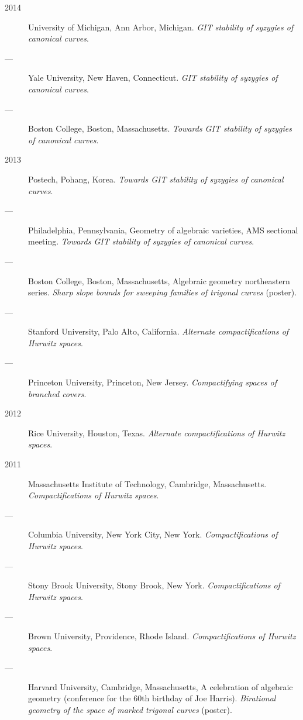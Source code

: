 \documentclass[11pt]{article}
\begin{document}
\begin{description}
\item[{2014}] University of Michigan, Ann Arbor, Michigan. \emph{GIT stability of syzygies of canonical curves}.
\item[{---}] Yale University, New Haven, Connecticut. \emph{GIT stability of syzygies of canonical curves}.
\item[{---}] Boston College, Boston, Massachusetts. \emph{Towards GIT stability of syzygies of canonical curves}.
\item[{2013}] Postech, Pohang, Korea. \emph{Towards GIT stability of syzygies of canonical curves}.
\item[{---}] Philadelphia, Pennsylvania, Geometry of algebraic varieties, AMS sectional meeting. \emph{Towards GIT stability of syzygies of canonical curves}.
\item[{---}] Boston College, Boston, Massachusetts, Algebraic geometry northeastern series. \emph{Sharp slope bounds for sweeping families of trigonal curves} (poster).
\item[{---}] Stanford University, Palo Alto, California. \emph{Alternate compactifications of Hurwitz spaces}.
\item[{---}] Princeton University, Princeton, New Jersey. \emph{Compactifying spaces of branched covers}.
\item[{2012}] Rice University, Houston, Texas. \emph{Alternate compactifications of Hurwitz spaces}.
\item[{2011}] Massachusetts Institute of Technology, Cambridge, Massachusetts. \emph{Compactifications of Hurwitz spaces}.
\item[{---}] Columbia University, New York City, New York. \emph{Compactifications of Hurwitz spaces}.
\item[{---}] Stony Brook University, Stony Brook, New York. \emph{Compactifications of Hurwitz spaces}.
\item[{---}] Brown University, Providence, Rhode Island. \emph{Compactifications of Hurwitz spaces}.
\item[{---}] Harvard University, Cambridge, Massachusetts, A celebration of algebraic geometry (conference for the 60th birthday of Joe Harris). \emph{Birational geometry of the space of marked trigonal curves} (poster).
\end{description}
\end{document}

